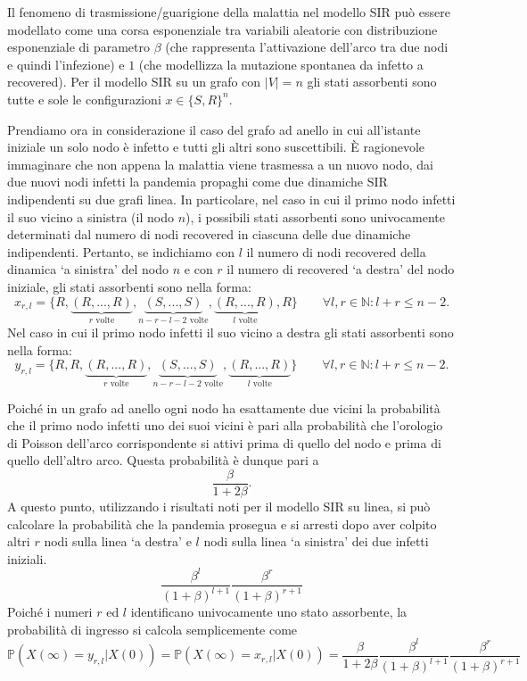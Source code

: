 
Il fenomeno di trasmissione/guarigione della malattia nel modello SIR può essere modellato come una corsa esponenziale tra variabili aleatorie con distribuzione esponenziale di parametro $\beta$ (che rappresenta l'attivazione dell'arco tra due nodi e quindi l'infezione) e $1$ (che modellizza la mutazione spontanea da infetto a recovered).
Per il modello SIR su un grafo con $ | V | = n$ gli stati assorbenti sono tutte e sole le configurazioni $x \in \{S,R\}^n$.

Prendiamo ora in considerazione il caso del grafo ad anello in cui all'istante iniziale un solo nodo è infetto e tutti gli altri sono suscettibili.
È ragionevole immaginare che non appena la malattia viene trasmessa a un nuovo nodo, dai due nuovi nodi infetti la pandemia propaghi come due dinamiche SIR indipendenti su due grafi linea.
In particolare, nel caso in cui il primo nodo infetti il suo vicino a sinistra (il nodo $n$), i possibili stati assorbenti sono univocamente determinati dal numero di nodi recovered in ciascuna delle due dinamiche indipendenti. 
Pertanto, se indichiamo con $l$ il numero di nodi recovered della dinamica `a sinistra' del nodo $n$ e con $r$ il numero di recovered  `a destra' del nodo iniziale, gli stati assorbenti sono nella forma:
\[
x_{r,l} = \{ R,  \underbrace{(R,...,R)}_{r \text{ volte}},  \underbrace{(S,...,S)}_{n-r-l-2 \text{ volte}},  \underbrace{(R,...,R)}_{l \text{ volte}}, R \} \quad \quad \forall l,r \in \mathbb{N}: l+r \leq n-2.
 \]
Nel caso in cui il primo nodo infetti il suo vicino a destra gli stati assorbenti sono nella forma: 
\[
y_{r,l} = \{ R,R,  \underbrace{(R,...,R)}_{r \text{ volte}},  \underbrace{(S,...,S)}_{n-r-l-2 \text{ volte}},  \underbrace{(R,...,R)}_{l \text{ volte}} \} \quad \quad \forall l,r \in \mathbb{N}: l+r \leq n-2.
 \]

Poiché in un grafo ad anello ogni nodo ha esattamente due vicini la probabilità che il primo nodo infetti uno dei suoi vicini è pari alla probabilità che l'orologio di Poisson dell'arco corrispondente si attivi prima di quello del nodo e prima di quello dell'altro arco.
Questa probabilità è dunque pari a
    \[
	\frac{\beta}{1+2\beta}.
        \]
A questo punto, utilizzando i risultati noti per il modello SIR su linea, si può calcolare la probabilità che la pandemia prosegua e si arresti dopo aver colpito altri $r$ nodi sulla linea `a destra' e $l$ nodi sulla linea `a sinistra' dei due infetti iniziali.
    \[
	\frac{\beta^l}{(1+\beta)^{l+1}}\frac{\beta^r}{(1+\beta)^{r+1}}
        \]
Poiché i numeri $r$ ed $l$ identificano univocamente uno stato assorbente, la probabilità di ingresso si calcola semplicemente come
 \[
	\mathbb{P}(X(\infty)=y_{r,l} | X(0))  =\mathbb{P}(X(\infty)=x_{r,l} | X(0))  =\frac{\beta}{1+2\beta}\frac{\beta^l}{(1+\beta)^{l+1}}\frac{\beta^r}{(1+\beta)^{r+1}}
        \]
       
